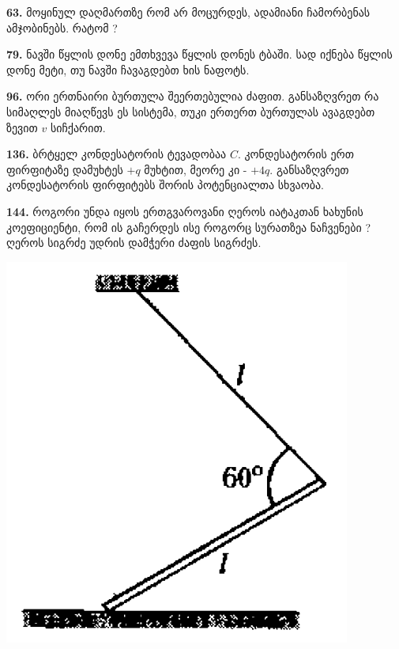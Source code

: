 \documentclass[12pt,a4paper,]{report}
\begin{document}
\textbf{63.} მოყინულ დაღმართზე რომ არ მოცურდეს, ადამიანი ჩამორბენას ამჯობინებს. რატომ ? 

\textbf{79.} ნავში წყლის დონე ემთხვევა წყლის დონეს ტბაში. სად იქნება წყლის დონე მეტი, თუ ნავში ჩავაგდებთ ხის ნაფოტს.
	
\textbf{96.} ორი ერთნაირი ბურთულა შეერთებულია ძაფით. განსაზღვრეთ რა სიმაღლეს მიაღწევს ეს სისტემა, თუკი ერთერთ ბურთულას ავაგდებთ ზევით $v$ სიჩქარით. 

\textbf{136.} ბრტყელ კონდესატორის ტევადობაა $C$. კონდესატორის ერთ ფირფიტაზე დამუხტეს $+q$ მუხტით, მეორე კი - $+4q$. განსაზღვრეთ კონდესატორის ფირფიტებს შორის პოტენციალთა სხვაობა.

\textbf{144.} როგორი უნდა იყოს ერთგვაროვანი ღეროს იატაკთან ხახუნის კოეფიციენტი, რომ ის გაჩერდეს ისე როგორც სურათზეა ნაჩვენები ? ღეროს სიგრძე უდრის დამჭერი ძაფის სიგრძეს. 
		\begin{center}
			\includegraphics[scale=0.3]{images/144.png}
		\end{center}
\end{document}
